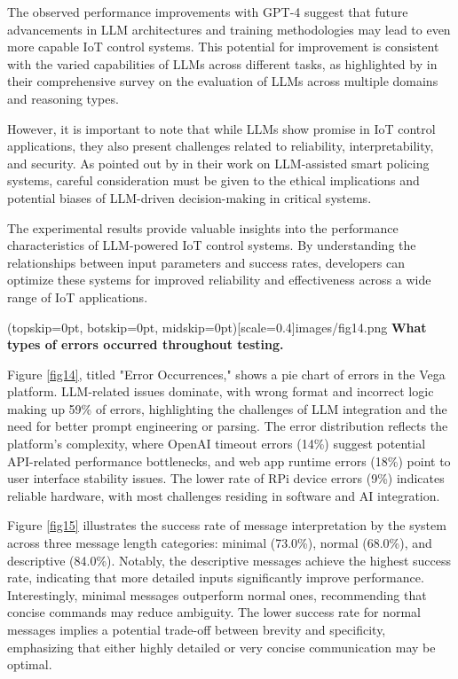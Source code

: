 \documentclass{ieeeaccess}
\begin{document}
The observed performance improvements with GPT-4 suggest that future advancements in LLM architectures and training methodologies may lead to even more capable IoT control systems. This potential for improvement is consistent with the varied capabilities of LLMs across different tasks, as highlighted by \citet{10.1145/3641289} in their comprehensive survey on the evaluation of LLMs across multiple domains and reasoning types.

However, it is important to note that while LLMs show promise in IoT control applications, they also present challenges related to reliability, interpretability, and security. As pointed out by \citet{10538107} in their work on LLM-assisted smart policing systems, careful consideration must be given to the ethical implications and potential biases of LLM-driven decision-making in critical systems.

The experimental results provide valuable insights into the performance characteristics of LLM-powered IoT control systems. By understanding the relationships between input parameters and success rates, developers can optimize these systems for improved reliability and effectiveness across a wide range of IoT applications. 

\Figure[t!](topskip=0pt, botskip=0pt,
midskip=0pt)[scale=0.4]{{images/fig14.png}}
{ \textbf{What types of errors occurred throughout testing.}\label{fig14}}

Figure \ref{fig14}, titled "Error Occurrences," shows a pie chart of errors in the Vega platform. LLM-related issues dominate, with wrong format and incorrect logic making up 59\% of errors, highlighting the challenges of LLM integration and the need for better prompt engineering or parsing. The error distribution reflects the platform's complexity, where OpenAI timeout errors (14\%) suggest potential API-related performance bottlenecks, and web app runtime errors (18\%) point to user interface stability issues. The lower rate of RPi device errors (9\%) indicates reliable hardware, with most challenges residing in software and AI integration.

Figure \ref{fig15} illustrates the success rate of message interpretation by the system across three message length categories: minimal (73.0\%), normal (68.0\%), and descriptive (84.0\%). Notably, the descriptive messages achieve the highest success rate, indicating that more detailed inputs significantly improve performance. Interestingly, minimal messages outperform normal ones, recommending that concise commands may reduce ambiguity. The lower success rate for normal messages implies a potential trade-off between brevity and specificity, emphasizing that either highly detailed or very concise communication may be optimal. 
\end{document}
